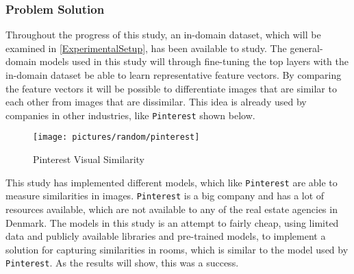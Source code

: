 \subsubsection{Problem Solution}
Throughout the progress of this study, an in-domain dataset, which will be examined in \autoref{ExperimentalSetup}, has been available to study. The general-domain models used in this study will through fine-tuning the top layers with the in-domain dataset be able to learn representative feature vectors. By comparing the feature vectors it will be possible to differentiate images that are similar to each other from images that are dissimilar. This idea is already used by companies in other industries, like \texttt{Pinterest} shown below.
\begin{figure}[H]
    \centering
    \texttt{[image: pictures/random/pinterest]}
    \caption{Pinterest Visual Similarity}
    \label{ref:pinterest}
\end{figure}
This study has implemented different models, which like \texttt{Pinterest} are able to measure similarities in images. \texttt{Pinterest} is a big company and has a lot of resources available, which are not available to any of the real estate agencies in Denmark. The models in this study is an attempt to fairly cheap, using limited data and publicly available libraries and pre-trained models, to implement a solution for capturing similarities in rooms, which is similar to the model used by \texttt{Pinterest}. As the results will show, this was a success.
